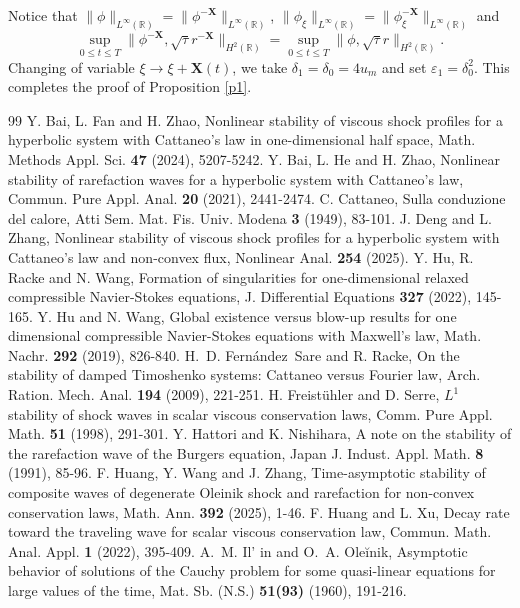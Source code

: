 \documentclass[10pt,reqno]{amsart}
\numberwithin{equation}{section}
\begin{document}
	Notice that $\|\phi\|_{L^{\infty}(\mathbb{R})}=\|\phi^{-\mathbf{X}}\|_{L^{\infty}(\mathbb{R})}$, $\|\phi_{\xi}\|_{L^{\infty}(\mathbb{R})}=\|\phi_{\xi}^{-\mathbf{X}}\|_{L^{\infty}(\mathbb{R})}$ and $$\sup_{0\leq t\leq T} \|\phi^{-\mathbf{X}}, \sqrt{\tau}r^{-\mathbf{X}}\|_{H^2(\mathbb{R})}=\sup_{0\leq t\leq T} \|\phi, \sqrt{\tau}r\|_{H^2(\mathbb{R})}.$$  Changing of variable $\xi\to\xi+\mathbf{X}(t)$, we take $\delta_{1}=\delta_{0}=4u_m$ and set $\varepsilon_{1}=\delta_{0}^2$. This completes the proof of Proposition \ref{p1}.
	\begin{thebibliography}{99}
		Y. Bai, L. Fan and H. Zhao, Nonlinear stability of viscous shock profiles for a hyperbolic system with Cattaneo's law in one-dimensional half space, Math. Methods Appl. Sci. {\bf 47} (2024), 5207-5242.
		Y. Bai, L. He and H. Zhao, Nonlinear stability of rarefaction waves for a hyperbolic system with Cattaneo's law, Commun. Pure Appl. Anal. {\bf 20} (2021), 2441-2474.
		C. Cattaneo, Sulla conduzione del calore, Atti Sem. Mat. Fis. Univ. Modena {\bf 3} (1949), 83-101.
		J. Deng and L. Zhang, Nonlinear stability of viscous shock profiles for a hyperbolic system with Cattaneo's law and non-convex flux, Nonlinear Anal. {\bf 254} (2025).
		Y. Hu, R. Racke and N. Wang, Formation of singularities for one-dimensional relaxed compressible Navier-Stokes equations, J. Differential Equations {\bf 327} (2022), 145-165.
		Y. Hu and N. Wang, Global existence versus blow-up results for one dimensional compressible Navier-Stokes equations with Maxwell's law, Math. Nachr. {\bf 292} (2019), 826-840.
		H.~D. Fern\'andez~Sare and R. Racke, On the stability of damped Timoshenko systems: Cattaneo versus Fourier law, Arch. Ration. Mech. Anal. {\bf 194} (2009), 221-251.
		H. Freist\"uhler and D. Serre, $L^1$ stability of shock waves in scalar viscous conservation laws, Comm. Pure Appl. Math. {\bf 51} (1998), 291-301.
		Y. Hattori and K. Nishihara, A note on the stability of the rarefaction wave of the Burgers equation, Japan J. Indust. Appl. Math. {\bf 8} (1991), 85-96.
		F. Huang, Y. Wang and J. Zhang, Time-asymptotic stability of composite waves of degenerate Oleinik shock and rarefaction for non-convex conservation laws, Math. Ann. {\bf 392} (2025), 1-46.
		F. Huang and L. Xu, Decay rate toward the traveling wave for scalar viscous conservation law, Commun. Math. Anal. Appl. {\bf 1} (2022), 395-409.
		A.~M. Il' in and O.~A. Ole\u inik, Asymptotic behavior of solutions of the Cauchy problem for some quasi-linear equations for large values of the time, Mat. Sb. (N.S.) {\bf 51(93)} (1960), 191-216.

\end{thebibliography}
\end{document}
